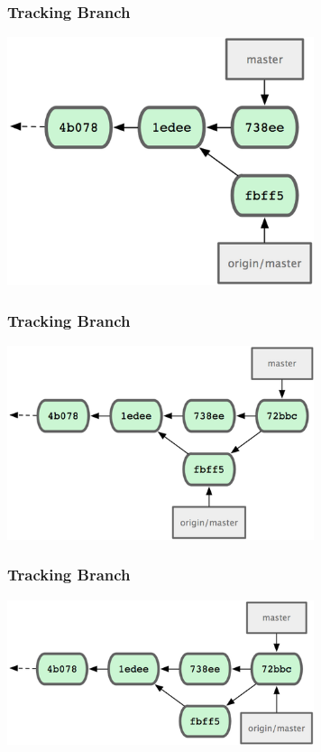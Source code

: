 \begin{frame}
  \frametitle{Tracking Branch}
  \begin{center}
    \includegraphics[width=9cm]{img/remote_1.png}
  \end{center}
\end{frame}

\begin{frame}
  \frametitle{Tracking Branch}
  \begin{center}
    \includegraphics[width=9cm]{img/remote_2.png}
  \end{center}
\end{frame}

\begin{frame}
  \frametitle{Tracking Branch}
  \begin{center}
    \includegraphics[width=9cm]{img/remote_3.png}
  \end{center}
\end{frame}

